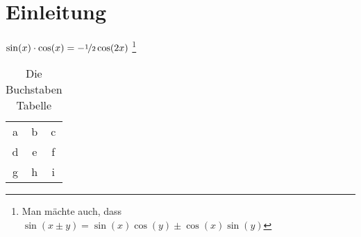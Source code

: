
\chapter{Einleitung}
\blindtext

$\sin(x)\cdot\cos(x) = -\nicefrac{1}{2} \cos(2x)$
\footnote{Man mächte auch, dass $\sin(x\pm y) = \sin(x)\cos(y) \pm \cos(x)\sin(y)$ }    %

\begin{table}[h]
  \centering
  \begin{tabular}{ccc}
    \toprule
    a & b & c\\
    d & e & f\\
    g & h & i\\
    \bottomrule
  \end{tabular}
  \caption{Die Buchstaben Tabelle}		
  \label{tab:buchstabentable}		%
\end{table}	